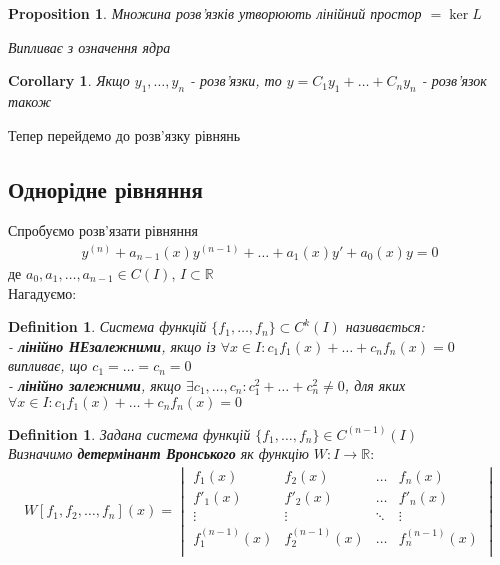 \documentclass[a4paper, 10pt]{article}
\theoremstyle{theoremdd}
\theoremstyle{theoremdd}
\newtheorem{definition}[theorem]{Definition}
\theoremstyle{theoremdd}
\theoremstyle{theoremdd}
\theoremstyle{theoremdd}
\newtheorem{proposition}[theorem]{Proposition}
\theoremstyle{theoremdd}
\theoremstyle{theoremdd}
\theoremstyle{theoremdd}
\newtheorem{corollary}[theorem]{Corollary}
\begin{document}
	\begin{proposition}
 Множина розв'язків утворюють лінійний простор $= \ker L$
	\end{proposition}

	\textit{Випливає з означення ядра}
	
	\begin{corollary}
 Якщо $y_1, \dots, y_n$ - розв'язки, то $y=C_1y_1+\dots+C_n y_n$ - розв'язок також
 \end{corollary}
	Тепер перейдемо до розв'язку рівнянь
	
	\subsection{Однорідне рівняння}
	Спробуємо розв'язати рівняння
	\begin{align*}
	y^{(n)} + a_{n-1}(x)y^{(n-1)}+\dots+a_1(x)y'+a_0(x)y = 0
	\end{align*}
	де $a_0, a_1,\dots,a_{n-1}\in C(I)$, $I \subset \mathbb{R}$\\
	Нагадуємо:\\
	\begin{definition}
 Система функцій $\{f_1,\dots,f_n\} \subset C^k(I)$ називається:\\
	- \textbf{лінійно НЕзалежними}, якщо із $\forall x \in I: c_1f_1(x) + \dots + c_n f_n(x) = 0$ випливає, що $c_1 = \dots = c_n = 0$\\
	- \textbf{лінійно залежними}, якщо $\exists c_1, \dots, c_n: c_1^2 + \dots + c_n^2 \neq 0$, для яких $\forall x \in I: c_1f_1(x) + \dots + c_n f_n(x) = 0$
	\end{definition}
	
	\begin{definition}
 Задана система функцій $\{f_1, \dots, f_n\} \in C^{(n-1)}(I)$\\
	Визначимо \textbf{детермінант Вронського} як функцію $W\colon I \to \mathbb{R}:$
	\begin{align*}
W[f_1,f_2,\dots,f_n](x) = 
\begin{vmatrix} 
	f_1(x) &  f_2(x) & \dots & f_n(x) \\ 
	f'_1(x) &  f'_2(x) & \dots & f'_n(x) \\
	\vdots &  \vdots & \ddots & \vdots \\
	f^{(n-1)}_1(x) &  f^{(n-1)}_2(x) & \dots & f^{(n-1)}_n(x) \\ 
\end{vmatrix}
	\end{align*}
	\end{definition}
	
\end{document}
